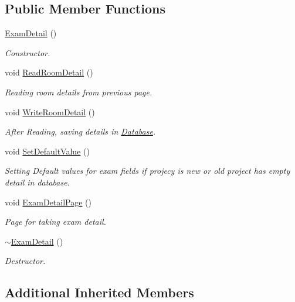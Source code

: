 \subsection*{Public Member Functions}
\begin{DoxyCompactItemize}
\item 
\hyperlink{classExamDetail_ad555c8a79c821f4e9e75c9b882366991}{Exam\-Detail} ()
\begin{DoxyCompactList}\small\item\em Constructor. \end{DoxyCompactList}\item 
void \hyperlink{classExamDetail_a460c5736a52aa73ee2627a322d9022f8}{Read\-Room\-Detail} ()
\begin{DoxyCompactList}\small\item\em Reading room details from previous page. \end{DoxyCompactList}\item 
void \hyperlink{classExamDetail_a51cb1af0e7d6f077aa662b120fd7aec2}{Write\-Room\-Detail} ()
\begin{DoxyCompactList}\small\item\em After Reading, saving details in \hyperlink{classDatabase}{Database}. \end{DoxyCompactList}\item 
void \hyperlink{classExamDetail_a3f17d1b2a87cf9530ce2dc5c65244165}{Set\-Default\-Value} ()
\begin{DoxyCompactList}\small\item\em Setting Default values for exam fields if projecy is new or old project has empty detail in database. \end{DoxyCompactList}\item 
void \hyperlink{classExamDetail_aa5bccd1f578e6149ad212206e95d9d57}{Exam\-Detail\-Page} ()
\begin{DoxyCompactList}\small\item\em Page for taking exam detail. \end{DoxyCompactList}\item 
\hyperlink{classExamDetail_ac613efeb54bd3ddc025b6665e23eb3b0}{$\sim$\-Exam\-Detail} ()
\begin{DoxyCompactList}\small\item\em Destructor. \end{DoxyCompactList}\end{DoxyCompactItemize}
\subsection*{Additional Inherited Members}


